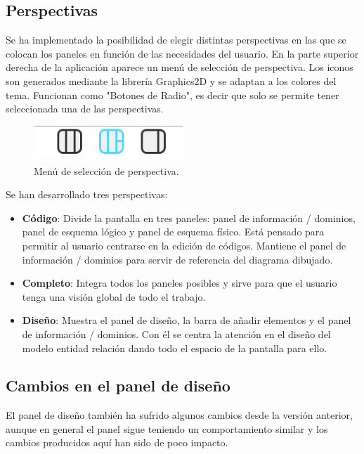 \subsection{Perspectivas}
Se ha implementado la posibilidad de elegir distintas perspectivas en las que se colocan los paneles en función de las necesidades del usuario. En la parte superior derecha de la aplicación aparece un menú de selección de perspectiva. Los iconos son generados mediante la librería Graphics2D \cite{g2d} y se adaptan a los colores del tema. Funcionan como "Botones de Radio", es decir que solo se permite tener seleccionada una de las perspectivas.\\
\begin{figure}[H]
            \centering
            \includegraphics[width=0.5\textwidth]{img/perspectivas.png}
            \caption{Menú de selección de perspectiva.}
\end{figure}

Se han desarrollado tres perspectivas:
\begin{itemize}
    \item \textbf{Código}: Divide la pantalla en tres paneles: panel de información / dominios, panel de esquema lógico y panel de esquema físico. Está pensado para permitir al usuario centrarse en la edición de códigos. Mantiene el panel de información / dominios para servir de referencia del diagrama dibujado.
    \item \textbf{Completo}: Integra todos los paneles posibles y sirve para que el usuario tenga una visión global de todo el trabajo.
    \item \textbf{Diseño}: Muestra el panel de diseño, la barra de añadir elementos y el panel de información / dominios. Con él se centra la atención en el diseño del modelo entidad relación dando todo el espacio de la pantalla para ello.
\end{itemize}

\subsection{Cambios en el panel de diseño}
El panel de diseño también ha sufrido algunos cambios desde la versión anterior, aunque en general el panel sigue teniendo un comportamiento similar y los cambios producidos aquí han sido de poco impacto.

